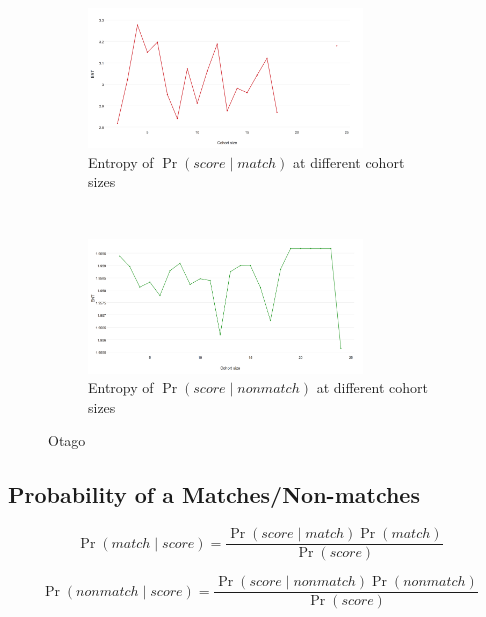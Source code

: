 \begin{figure}[htbp]
    \centering
    \begin{subfigure}[t]{\textwidth}
        \centering
        \includegraphics[width=0.8\textwidth]{dataset/otago/ent_psm}
        \caption{Entropy of $\Pr{(score \mid match)}$ at different cohort sizes}
        \label{fig:otago_ent_psm} %
    \end{subfigure}%
    \\
    \begin{subfigure}[t]{\textwidth}
        \centering
        \includegraphics[width=0.8\textwidth]{dataset/otago/ent_psnm}
        \caption{Entropy of $\Pr{(score \mid nonmatch)}$ at different cohort 
        sizes}
        \label{fig:otago_ent_psnm} %
    \end{subfigure}%
    \caption{Otago}
    \label{fig:otago_entemd} %
\end{figure}

\FloatBarrier%
\subsection{Probability of a Matches/Non-matches}

$$\Pr{(match \mid score)} = \frac{\Pr{(score \mid match)}\Pr{(match)}}
    {\Pr{(score)}}$$

$$\Pr{(nonmatch \mid score)} = \frac{\Pr{(score \mid nonmatch)}\Pr{(nonmatch)}}
    {\Pr{(score)}}$$

